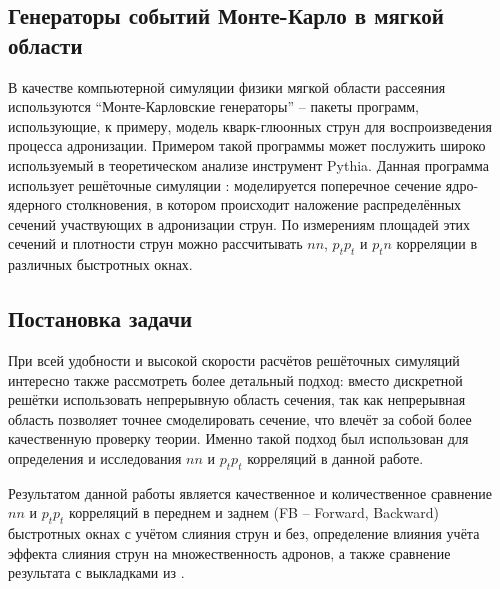 \subsection{Генераторы событий Монте-Карло в мягкой области}
В качестве компьютерной симуляции физики мягкой области рассеяния используются ``Монте-Карловские генераторы'' \cite{MonteCarlo1,MonteCarlo2} -- пакеты программ, использующие, к примеру, модель кварк-глюонных струн для воспроизведения процесса адронизации. Примером такой программы может послужить широко используемый в теоретическом анализе инструмент Pythia. Данная программа использует решёточные симуляции \cite{TransLattice1,TransLattice2}: моделируется поперечное сечение ядро-ядерного столкновения, в котором происходит наложение распределённых сечений участвующих в адронизации струн. По измерениям площадей этих сечений и плотности струн можно рассчитывать $nn$, $p_t p_t$ и $p_t n$ корреляции в различных быстротных окнах.
\subsection{Постановка задачи}
При всей удобности и высокой скорости расчётов решёточных симуляций интересно также рассмотреть более детальный подход: вместо дискретной решётки использовать непрерывную область сечения, так как непрерывная область позволяет точнее смоделировать сечение, что влечёт за собой более качественную проверку теории. Именно такой подход был использован для определения и исследования $nn$ и $p_tp_t$ корреляций в данной работе. 

Результатом данной работы является качественное и количественное сравнение $nn$ и $p_tp_t$ корреляций в переднем и заднем (FB -- Forward, Backward) быстротных окнах с учётом слияния струн и без, определение влияния учёта эффекта слияния струн на множественность адронов, а также сравнение результата с выкладками из \cite{bStatement}.
